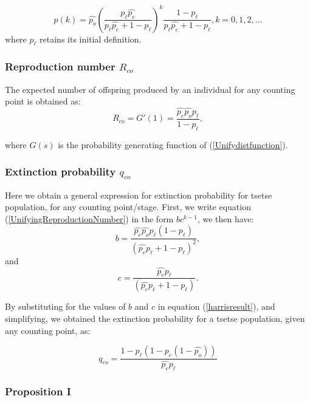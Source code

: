 \documentclass[smallextended]{svjour3}
\begin{document}

\begin{equation}
\label{Unifydistfunction} 
p(k) = \hat{p_o}(\frac{p_{\ell}\hat{p_e}}{p_{\ell}\hat{p_e}+1-p_{\ell}})^{k}\frac{1-p_{\ell}}{p_{\ell}\hat{p_e}+1-p_{\ell}},  k =0,1,2,...
\end{equation} 
where $p_{\ell}$ retains its initial definition. 

\subsubsection{\bf Reproduction number $R_{co}$}
The expected number of offspring produced by an individual for any counting point is obtained as:  
\begin{equation}
\label{UnifyingReproductionNumber}
R_{co} = G'(1) = \frac{\hat{p_e}\hat{p_o}p_{\ell}}{1-p_{\ell}},
\end{equation}  

where $G(s)$ is the probability generating function of (\ref{Unifydistfunction}).

\subsubsection{\bf Extinction probability $q_{co}$}
Here we obtain a general expression for extinction probability for tsetse population, for any counting point/stage.  First,  we write equation (\ref{UnifyingReproductionNumber}) in the form $bc^{k-1}$, we then have:
$$ b = \frac{\hat{p_e}\hat{p_o}p_{\ell}(1-p_{\ell})}{(\hat{p_e}p_{\ell} + 1 - p_{\ell})^2}, $$
and 
$$ c = \frac{\hat{p_e}p_{\ell}}{(\hat{p_e}p_{\ell} + 1 - p_{\ell})}. $$


By substituting for the values of  $b$ and $c$ in equation (\ref{harrisresult}), and simplifying, we obtained the extinction probability for a tsetse population, given any counting point, as:

\begin{equation}
\label{UnifyingextinctionProb}	
q_{eo} = \frac{1-p_{\ell}(1-\hat{p_e}(1-\hat{p_o}))}{\hat{p_e}p_{\ell}} 
\end{equation}  

\subsubsection{\bf Proposition I}
\end{document}
